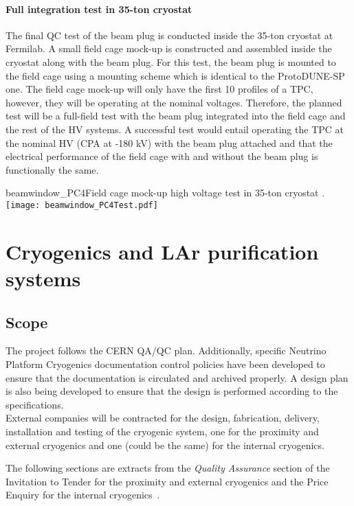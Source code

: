 \paragraph{Full integration test in 35-ton cryostat}
The final QC test of the beam plug is conducted inside the 35-ton cryostat at Fermilab. A small field cage mock-up is constructed and assembled inside the cryostat along with the beam plug. For this test, the beam plug is mounted to the field cage using a mounting scheme which is identical to the ProtoDUNE-SP one. The field cage mock-up will only have the first 10 profiles of a TPC, however, they will be operating at the nominal voltages. Therefore, the planned test will be a full-field test with the beam plug integrated into the field cage and the rest of the HV systems. A successful test would entail operating the TPC at the nominal HV (CPA at -180 kV) with the beam plug attached and that the electrical performance of the field cage with and without the beam plug is functionally the same.

\begin{cdrfigure}{beamwindow_PC4}{Field cage mock-up high voltage test in 35-ton cryostat .}
  \texttt{[image: beamwindow\_PC4Test.pdf]}
\end{cdrfigure}

\section{Cryogenics and LAr purification systems}

\subsection{Scope}

The project follows the CERN QA/QC plan. Additionally, specific Neutrino Platform Cryogenics documentation control policies have been developed to ensure that the documentation is circulated and archived properly. A design plan is also being developed to ensure that the design is performed according to the specifications.\\
%
External companies will be contracted for the design, fabrication, delivery, installation and testing of the cryogenic system, one for the proximity and external cryogenics and one (could be the same) for the internal cryogenics.

The following sections are extracts from the \textit{Quality Assurance} section of the Invitation to Tender for the proximity and external cryogenics and the Price Enquiry for the internal cryogenics~\cite{invit-tender-cryo}.

